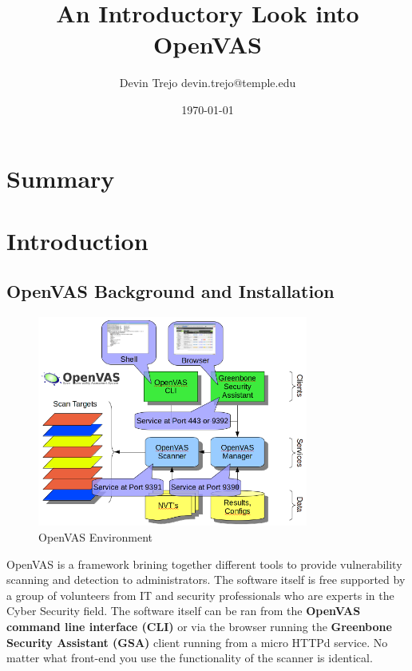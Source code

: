 \documentclass[12pt]{article}
\begin{document}
\title{An Introductory Look into OpenVAS}
\author{Devin Trejo \tabularnewline devin.trejo@temple.edu }
\date{\today}
\maketitle

\section{Summary}
\label{sect:summary}

\section{Introduction}
\label{sect:intro}
\subsection{OpenVAS Background and Installation}
\label{sec:background}

\begin{figure}[ht]
    \centering
    \includegraphics[width=3.5in]{images/openvas-7-enviorment.png}
    \caption{OpenVAS Environment}
    \label{fig:openvasenv}
\end{figure}

OpenVAS is a framework brining together different tools to provide 
vulnerability scanning and detection to administrators. The software
itself is free supported by a group of volunteers from IT and security 
professionals who are experts in the Cyber Security field. The software itself
can be ran from the \textbf{OpenVAS command line interface (CLI)} or via the 
browser running the \textbf{Greenbone Security Assistant (GSA)} client running 
from a micro HTTPd service. No matter what front-end you use the 
functionality of the scanner is identical. 
\end{document}
